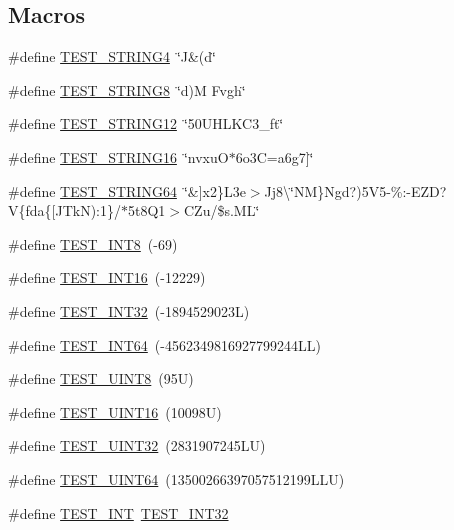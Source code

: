 \subsection*{Macros}
\begin{DoxyCompactItemize}
\item 
\#define \hyperlink{unittests-constants_8h_a0dcf40c8779964fbd58606045fa4dd12}{T\+E\+S\+T\+\_\+\+S\+T\+R\+I\+N\+G4}~\char`\"{}J\&(d\char`\"{}
\item 
\#define \hyperlink{unittests-constants_8h_a8545a3af5fd31da15e2d0065498c4283}{T\+E\+S\+T\+\_\+\+S\+T\+R\+I\+N\+G8}~\char`\"{}d)M Fvgh\char`\"{}
\item 
\#define \hyperlink{unittests-constants_8h_ab644f8c21cad6bc15469291d39142a2c}{T\+E\+S\+T\+\_\+\+S\+T\+R\+I\+N\+G12}~\char`\"{}50\+U\textquotesingle{}\+H\+L\+K\+C3\+\_\+ft\char`\"{}
\item 
\#define \hyperlink{unittests-constants_8h_a46405db1ac4c0e605db720082f5e80c9}{T\+E\+S\+T\+\_\+\+S\+T\+R\+I\+N\+G16}~\char`\"{}nvxuO$\ast$6o3\+C=a6g7\mbox{]}\char`\"{}
\item 
\#define \hyperlink{unittests-constants_8h_aa04ef8d91c28a158c9a547e35cbbb164}{T\+E\+S\+T\+\_\+\+S\+T\+R\+I\+N\+G64}~\char`\"{}\&\mbox{]}x2\}L3e$>$Jj8\textbackslash{}\char`\"{}NM\}Ngd?)5\+V5-\/\%\+:-\/\+E\+Z\+D?\+V\{fda\{\mbox{[}\+J\+Tk\+N)\+:1\}/$\ast$5t8\+Q1$>$\+C\+Zu/\$s.\+M\+L\char`\"{}
\item 
\#define \hyperlink{unittests-constants_8h_a4161136bcd02fde2a869054e34800b33}{T\+E\+S\+T\+\_\+\+I\+N\+T8}~(-\/69)
\item 
\#define \hyperlink{unittests-constants_8h_a26d26aad831b9eb073965098be82d535}{T\+E\+S\+T\+\_\+\+I\+N\+T16}~(-\/12229)
\item 
\#define \hyperlink{unittests-constants_8h_a2604280335e4602bcf5e5612a4dc46ea}{T\+E\+S\+T\+\_\+\+I\+N\+T32}~(-\/1894529023\+L)
\item 
\#define \hyperlink{unittests-constants_8h_a70e25151f5bc1fd6c9a87856acc40bb8}{T\+E\+S\+T\+\_\+\+I\+N\+T64}~(-\/4562349816927799244\+L\+L)
\item 
\#define \hyperlink{unittests-constants_8h_a9a493e3e4fe69d0b8c338869ebcadbc4}{T\+E\+S\+T\+\_\+\+U\+I\+N\+T8}~(95\+U)
\item 
\#define \hyperlink{unittests-constants_8h_ada84310dd4f52d94096d5baed5eb75e1}{T\+E\+S\+T\+\_\+\+U\+I\+N\+T16}~(10098\+U)
\item 
\#define \hyperlink{unittests-constants_8h_a7504d2f34f62312f47d31a9a8c385961}{T\+E\+S\+T\+\_\+\+U\+I\+N\+T32}~(2831907245\+L\+U)
\item 
\#define \hyperlink{unittests-constants_8h_a8595e98ffde77e761aeae609e0ef5b89}{T\+E\+S\+T\+\_\+\+U\+I\+N\+T64}~(13500266397057512199\+L\+L\+U)
\item 
\#define \hyperlink{unittests-constants_8h_a70256dfec899dd29174339b72926d0a4}{T\+E\+S\+T\+\_\+\+I\+NT}~\hyperlink{unittests-constants_8h_a2604280335e4602bcf5e5612a4dc46ea}{T\+E\+S\+T\+\_\+\+I\+N\+T32}
\end{DoxyCompactItemize}


